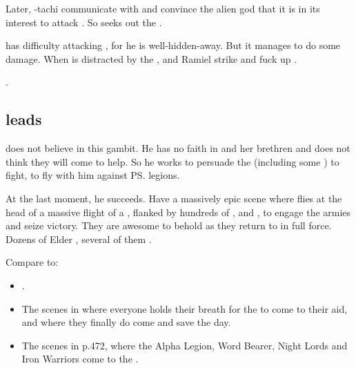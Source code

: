 Later, \Ishnaruchaefir-tachi communicate with \HothNrul{} and convince the alien god that it is in its interest to attack \Daggerrain.
So \HothNrul{} seeks out the \banelord. 

\HothNrul{} has difficulty attacking \Daggerrain, for he is well-hidden-away. 
But it manages to do some damage. 
When \Daggerrain{} is distracted by the \xs{}, \Azraid{} and Ramiel strike and fuck up \Daggerrain. 

\HothNrul{} . 







\subsection{\Ishnaruchaefir leads \dragons}
\Ishnaruchaefir{} does not believe in this gambit. He has no faith in \Tiamat{} and her brethren and does not think they will come to help. 
So he works to persuade the \dragons{} (including some ) to fight, to fly with him against \ps{\Daggerrain}{} legions. 

At the last moment, he succeeds. 
Have a massively epic scene where \Ishnaruchaefir{} flies at the head of a massive flight of a \dragons, flanked by hundreds of \rachyths, \drakes{} and \pdaemons, to engage the \bane{} armies and seize victory.
They are awesome to behold as they return to \Miith in full force. 
Dozens of Elder \Dragons, several of them \shaeeroth.

Compare to: 

\begin{itemize}
  \item 
    . 
  \item 
    The scenes in  where everyone holds their breath for the \dragons{} to come to their aid, and where they finally do come and save the day.
  \item 
    The scenes in  p.472, where the Alpha Legion, Word Bearer, Night Lords and Iron Warriors come to the . 
\end{itemize}








